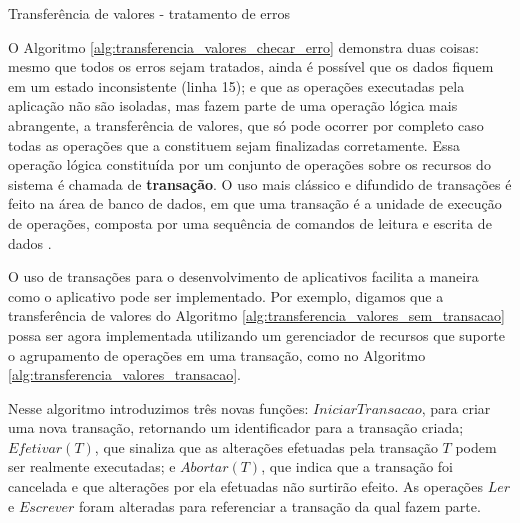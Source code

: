 \documentclass[11pt,twoside,a4paper]{book}
\begin{document}
\begin{algorithm}
\caption{Transferência de valores - tratamento de erros}
\label{alg:transferencia_valores_checar_erro}
\dontprintsemicolon
{}
\end{algorithm}

O Algoritmo \ref{alg:transferencia_valores_checar_erro} demonstra duas coisas: mesmo que todos os erros sejam tratados, ainda é possível que os dados fiquem em um estado inconsistente (linha 15); e que as operações executadas pela aplicação não são isoladas, mas fazem parte de uma operação lógica mais abrangente, a transferência de valores, que só pode ocorrer por completo caso todas as operações que a constituem sejam finalizadas corretamente. Essa operação lógica constituída por um conjunto de operações sobre os recursos do sistema é chamada de \textbf{transação}. O uso mais clássico e difundido de transações é feito na área de banco de dados, em que uma transação é a unidade de execução de operações, composta por uma sequência de comandos de leitura e escrita de dados \cite{garcia-molina, vaca}.

O uso de transações para o desenvolvimento de aplicativos facilita a maneira como o aplicativo pode ser implementado. Por exemplo, digamos que a transferência de valores do Algoritmo \ref{alg:transferencia_valores_sem_transacao} possa ser agora implementada utilizando um gerenciador de recursos que suporte o agrupamento de operações em uma transação, como no Algoritmo \ref{alg:transferencia_valores_transacao}. 

Nesse algoritmo introduzimos três novas funções: $IniciarTransacao$, para criar uma nova transação, retornando um identificador para a transação criada; $Efetivar(T)$, que sinaliza que as alterações efetuadas pela transação $T$ podem ser realmente executadas; e $Abortar(T)$, que indica que a transação foi cancelada e que alterações por ela efetuadas não surtirão efeito. As operações $Ler$ e $Escrever$ foram alteradas para referenciar a transação da qual fazem parte.
\end{document}
